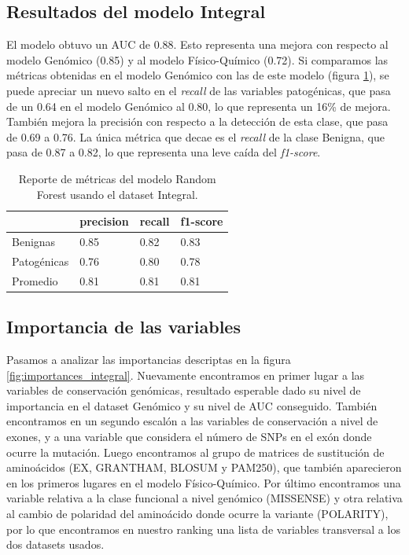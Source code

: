 \subsection{Resultados del modelo Integral}

El modelo obtuvo un AUC de 0.88. Esto representa una mejora con respecto al modelo Genómico (0.85) y al modelo Físico-Químico (0.72). Si comparamos las métricas obtenidas en el modelo Genómico con las de este modelo (figura \ref{tab:metrics_integral}), se puede apreciar un nuevo salto en el \textit{recall} de las variables patogénicas, que pasa de un 0.64 en el modelo Genómico al 0.80, lo que representa un 16\% de mejora. También mejora la precisión con respecto a la detección de esta clase, que pasa de 0.69 a 0.76. La única métrica que decae es el \textit{recall} de la clase Benigna, que pasa de 0.87 a 0.82, lo que representa una leve caída del \textit{f1-score}.

\begin{table}[H]
\centering
\begin{tabular}{|l|l|l|l|}
\hline
             & precision & recall & f1-score \\ \hline
Benignas     & 0.85      & 0.82   & 0.83     \\ \hline
Patogénicas  & 0.76      & 0.80   & 0.78     \\ \hline
Promedio     & 0.81      & 0.81   & 0.81     \\ \hline
\end{tabular}
\caption{Reporte de métricas del modelo Random Forest usando el dataset Integral.}
\label{tab:metrics_integral}
\end{table}


\subsection{Importancia de las variables}

Pasamos a analizar las importancias descriptas en la figura \ref{fig:importances_integral}. Nuevamente encontramos en primer lugar a las variables de conservación genómicas, resultado esperable dado su nivel de importancia en el dataset Genómico y su nivel de AUC conseguido. También encontramos en un segundo escalón a las variables de conservación a nivel de exones, y a una variable que considera el número de SNPs en el exón donde ocurre la mutación. Luego encontramos al grupo de matrices de sustitución de aminoácidos (EX, GRANTHAM, BLOSUM y PAM250), que también aparecieron en los primeros lugares en el modelo Físico-Químico. Por último encontramos una variable relativa a la clase funcional a nivel genómico (MISSENSE) y otra relativa al cambio de polaridad del aminoácido donde ocurre la variante (POLARITY), por lo que encontramos en nuestro ranking una lista de variables transversal a los dos datasets usados. 

